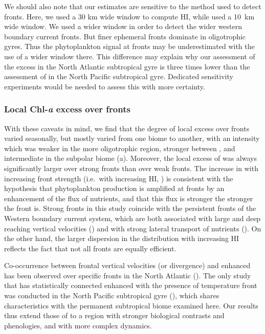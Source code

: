 We should also note that our estimates are sensitive to the method used to detect fronts. Here, we used a 30 km wide window to compute HI, while \textcite{liu_2016} used a \qty{10}{\km} wide window.
We used a wider window in order to detect the wider western boundary current fronts.
But finer ephemeral fronts dominate in oligotrophic gyres.
Thus the phytoplankton signal at fronts may be underestimated with the use of a wider window there.
This difference may explain why our assessment of the excess  in the North Atlantic subtropical gyre is three times lower than the assessment of \textcite{liu_2016} in the North Pacific subtropical gyre.
Dedicated sensitivity experiments would be needed to assess this with more certainty.


\subsubsection{Local Chl-\textit{a} excess over fronts}

With these caveats in mind, we find that the degree of local  excess over fronts varied seasonally, but mostly varied from one biome to another, with an intensity which was weaker in the more oligotrophic region, stronger between , and intermediate in the subpolar biome (a).
Moreover, the local excess of  was always significantly larger over strong fronts than over weak fronts.
The increase in  with increasing front strength (i.e.\ with increasing HI, ) is consistent with the hypothesis that phytoplankton production is amplified at fronts by an enhancement of the flux of nutrients, and that this flux is stronger the stronger the front is.
Strong fronts in this study coincide with the persistent fronts of the Western boundary current system, which are both associated with large and deep reaching vertical velocities (\cite{liao_2022}) and with strong lateral transport of nutrients (\cite{pelegri_1996}).
On the other hand, the larger dispersion in the  distribution with increasing HI reflects the fact that not all fronts are equally efficient.

Co-occurrence between frontal vertical velocities (or divergence) and enhanced  has been observed over specific fronts in the North Atlantic (\cite{mourino_2004, allen_2005, lehahn_2007}).
The only study that has statistically connected enhanced  with the presence of temperature front was conducted in the North Pacific subtropical gyre (\cite{liu_2016}), which shares characteristics with the permanent subtropical biome examined here.
Our results thus extend those of \textcite{liu_2016} to a region with stronger biological contrasts and phenologies, and with more complex dynamics.


